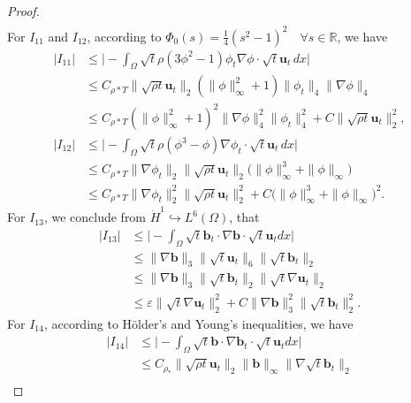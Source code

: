 \documentclass[11pt]{article}
\numberwithin{equation}{section}
\begin{document}
\begin{proof}
\begin{equation*}
\begin{split}
\end{split}
\end{equation*}
For  $I_{11}$  and $I_{12}$, according to $\Phi_0(s) = \frac{1}{4}(s^2 - 1)^2 \quad \forall s \in \mathbb{R}$, we have
\begin{equation}
\begin{split}
|I_{11}| &\leq \big| -\int_{\Omega} \sqrt{t}\rho(3\phi^2-1) \phi_t \nabla\phi\cdot \sqrt{t} \mathbf{u}_t \, dx \big| \\
&\leq C_{\rho*T} \|\sqrt{\rho t} \mathbf{u}_t\|_{2} (\|\phi\|_{\infty}^2+1) \| \phi_t\|_{4} \|\nabla\phi\|_{4} \\
&\leq  C_{\rho*T}(\|\phi\|_{\infty}^2+1)^2 \|\nabla\phi\|_{4}^2 \| \phi_t\|_{4}^2 + C \|\sqrt{\rho t} \mathbf{u}_t\|_{2}^2 ,\\
|I_{12}| &\leq \big| -\int_{\Omega} \sqrt{t} \rho(\phi^3 - \phi) \nabla\phi_t \cdot\sqrt{t} \mathbf{u}_t \, dx \big| \\&\leq C_{\rho*T} \|\nabla\phi_t\|_{2} \|\sqrt{\rho t} \mathbf{u}_t\|_{2} \big( \|\phi\|_{\infty}^3 + \|\phi\|_{\infty} \big) \\
&\leq C_{\rho*T} \|\nabla\phi_t\|_{2}^2 \|\sqrt{\rho t} \mathbf{u}_t\|_{2}^2 + C\big( \|\phi\|_{\infty}^3 + \|\phi\|_{\infty} \big)^2.
\end{split}
\end{equation}
For $I_{13}$, we conclude from  $\dot{H}^1\hookrightarrow L^6(\Omega)$, that
\begin{equation}
\begin{split}
|I_{13}| &\leq \big|-\int_{\Omega}\sqrt{t} \mathbf{b}_t \cdot \nabla \mathbf{b} \cdot \sqrt{t} \mathbf{u}_t dx\big| \\&\leq \| \nabla \mathbf{b} \|_3 \| \sqrt{t} \mathbf{u}_t \|_6 \| \sqrt{t} \mathbf{b}_t \|_2\\
&\leq \| \nabla \mathbf{b} \|_3 \| \sqrt{t} \mathbf{b}_t \|_2 \| \sqrt{t} \nabla \mathbf{u}_t \|_2
\\& \leq \varepsilon \| \sqrt{t} \nabla \mathbf{u}_t \|_2^2 + C \| \nabla \mathbf{b} \|_3^2 \| \sqrt{t} \mathbf{b}_t \|_2^2.
\end{split}
\end{equation}
For \( I_{14}\),  according to H\"{o}lder's and Young's inequalities,  we have
\begin{equation}
\begin{split}
|I_{14}| &\leq \big|-\int_{\Omega}\sqrt{t} \mathbf{b} \cdot \nabla \mathbf{b}_t \cdot \sqrt{t} \mathbf{u}_t dx\big| \\&\leq  C_{\rho_*}\| \sqrt{\rho t}\mathbf{u}_t \|_2 \| \mathbf{b} \|_\infty \| \nabla\sqrt{t} \mathbf{b}_t \|_2\\

\end{split}
\end{equation}
\end{proof}
\end{document}
